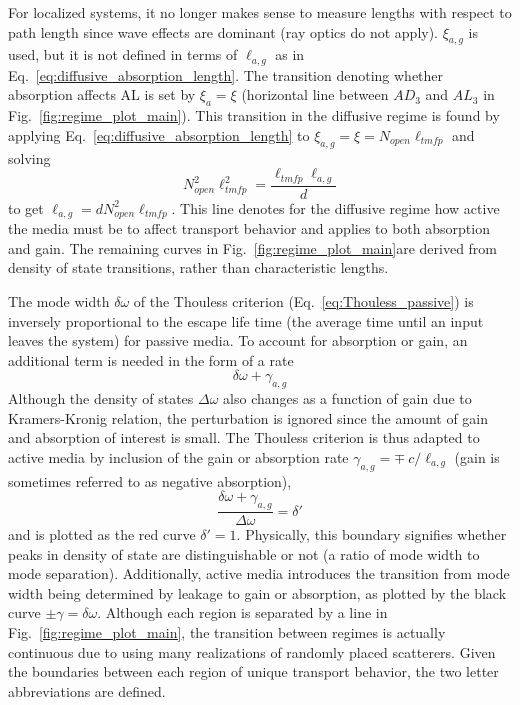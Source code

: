 For localized systems, it no longer makes sense to measure lengths with respect to path length since wave effects are dominant (ray optics do not apply). $\xi_{a,g}$ is used, but it is not defined in terms of $\ell_{a,g}$ as in Eq.~\ref{eq:diffusive_absorption_length}.  The transition denoting whether absorption affects AL is set by $\xi_{a} = \xi$ (horizontal line between $AD_3$ and $AL_3$ in Fig.~\ref{fig:regime_plot_main}). This transition in the diffusive regime is found by applying Eq.~\ref{eq:diffusive_absorption_length} to $\xi_{a,g} = \xi = N_{open} \ell_{tmfp}$ and solving 
\begin{equation}
N_{open}^2 \ell_{tmfp}^2 = \frac{\ell_{tmfp}\ell_{a,g}}{d}
\end{equation}
to get $\ell_{a,g} =d N_{open}^2 \ell_{tmfp}$. This line denotes for the diffusive regime how active the media must be to affect transport behavior and applies to both absorption and gain. The remaining curves in Fig.~\ref{fig:regime_plot_main}are derived from density of state transitions, rather than characteristic lengths.

The mode width $\delta \omega$ of the Thouless criterion (Eq.~\ref{eq:Thouless_passive}) is inversely proportional to the escape life time (the average time until an input leaves the system) for passive media. To account for absorption or gain, an additional term is needed in the form of a rate
\begin{equation}
\delta \omega +\gamma_{a,g}
\end{equation}
Although the density of states $\Delta \omega$ also changes as a function of gain due to Kramers-Kronig relation\cite{1999_Jackson}, the perturbation is ignored since the amount of gain and absorption of interest is small. 
The Thouless criterion is thus adapted to active media by inclusion of the gain or absorption rate $\gamma_{a,g}=\mp~c/\ell_{a,g}$ (gain is sometimes referred to as negative absorption\cite{1968_Letokhov}),
\begin{equation}
\frac{\delta \omega +\gamma_{a,g}}{\Delta \omega} = \delta'
\label{eq:generalized_thouless}
\end{equation}
and is plotted as the red curve $\delta'=1$. Physically, this boundary signifies whether peaks in density of state are distinguishable or not (a ratio of mode width to mode separation). Additionally, active media introduces the transition from mode width being determined by leakage to gain or absorption, as plotted by the black curve $\pm \gamma = \delta \omega$. %
Although each region is separated by a line in Fig.~\ref{fig:regime_plot_main}, the transition between regimes is actually continuous due to using many realizations of randomly placed scatterers. Given the boundaries between each region of unique transport behavior, the two letter abbreviations are defined.

